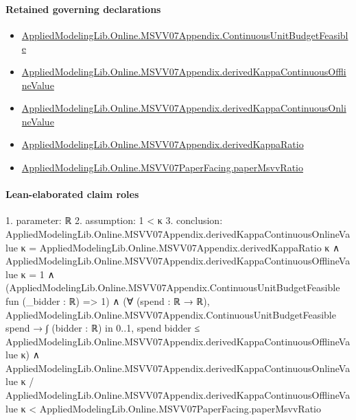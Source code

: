 \documentclass[10pt]{article}
\begin{document}
\paragraph{Retained governing declarations}
\begin{itemize}\raggedright
\item \hyperlink{governing-declaration-7007fb2a7bf81a00}{Applied\allowbreak{}Modeling\allowbreak{}Lib.\allowbreak{}Online.\allowbreak{}MSVV07\allowbreak{}Appendix.\allowbreak{}Continuous\allowbreak{}Unit\allowbreak{}Budget\allowbreak{}Feasible}
\item \hyperlink{governing-declaration-0510874bec2af784}{Applied\allowbreak{}Modeling\allowbreak{}Lib.\allowbreak{}Online.\allowbreak{}MSVV07\allowbreak{}Appendix.\allowbreak{}derived\allowbreak{}Kappa\allowbreak{}Continuous\allowbreak{}Offline\allowbreak{}Value}
\item \hyperlink{governing-declaration-c85b36feb7782e32}{Applied\allowbreak{}Modeling\allowbreak{}Lib.\allowbreak{}Online.\allowbreak{}MSVV07\allowbreak{}Appendix.\allowbreak{}derived\allowbreak{}Kappa\allowbreak{}Continuous\allowbreak{}Online\allowbreak{}Value}
\item \hyperlink{governing-declaration-95a6e05cf6f7d278}{Applied\allowbreak{}Modeling\allowbreak{}Lib.\allowbreak{}Online.\allowbreak{}MSVV07\allowbreak{}Appendix.\allowbreak{}derived\allowbreak{}Kappa\allowbreak{}Ratio}
\item \hyperlink{governing-declaration-11865634591d1a39}{Applied\allowbreak{}Modeling\allowbreak{}Lib.\allowbreak{}Online.\allowbreak{}MSVV07\allowbreak{}Paper\allowbreak{}Facing.\allowbreak{}paper\allowbreak{}Msvv\allowbreak{}Ratio}
\end{itemize}
\paragraph{Lean-elaborated claim roles}\begin{ReviewVerbatim}
1. parameter: ℝ
2. assumption: 1 < κ
3. conclusion: AppliedModelingLib.Online.MSVV07Appendix.derivedKappaContinuousOnlineValue κ =
    AppliedModelingLib.Online.MSVV07Appendix.derivedKappaRatio κ ∧
  AppliedModelingLib.Online.MSVV07Appendix.derivedKappaContinuousOfflineValue κ = 1 ∧
    (AppliedModelingLib.Online.MSVV07Appendix.ContinuousUnitBudgetFeasible fun (_bidder : ℝ) => 1) ∧
      (∀ (spend : ℝ → ℝ),
          AppliedModelingLib.Online.MSVV07Appendix.ContinuousUnitBudgetFeasible spend →
            ∫ (bidder : ℝ) in 0..1, spend bidder ≤
              AppliedModelingLib.Online.MSVV07Appendix.derivedKappaContinuousOfflineValue κ) ∧
        AppliedModelingLib.Online.MSVV07Appendix.derivedKappaContinuousOnlineValue κ /
            AppliedModelingLib.Online.MSVV07Appendix.derivedKappaContinuousOfflineValue κ <
          AppliedModelingLib.Online.MSVV07PaperFacing.paperMsvvRatio
\end{ReviewVerbatim}
\end{document}
